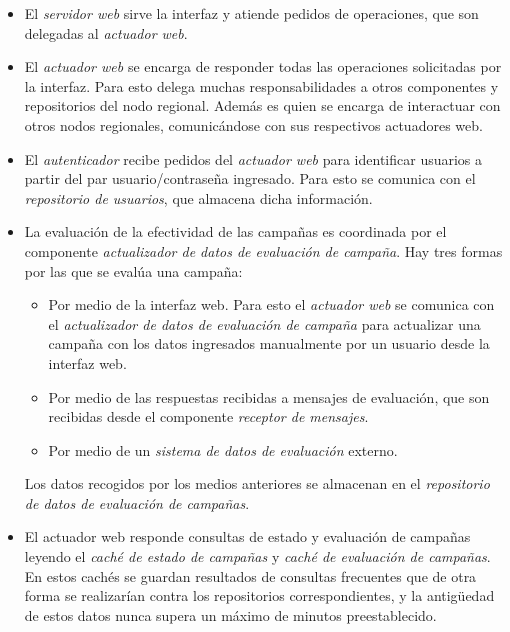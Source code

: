 \documentclass[a4paper, 10pt, twoside]{article}
\begin{document}
\begin{itemize}
  \item El \textit{servidor web} sirve la interfaz y atiende pedidos de operaciones, que son delegadas al \textit{actuador web}.

  \item El \textit{actuador web} se encarga de responder todas las operaciones solicitadas por la interfaz. Para esto delega muchas responsabilidades a otros componentes y repositorios del nodo regional. Además es quien se encarga de interactuar con otros nodos regionales, comunicándose con sus respectivos actuadores web.

  \item El \textit{autenticador} recibe pedidos del \textit{actuador web} para identificar usuarios a partir del par usuario/contraseña ingresado. Para esto se comunica con el \textit{repositorio de usuarios}, que almacena dicha información.

  \item La evaluación de la efectividad de las campañas es coordinada por el componente \textit{actualizador de datos de evaluación de campaña}. Hay tres formas por las que se evalúa una campaña:

  \begin{itemize}
    \item Por medio de la interfaz web. Para esto el \textit{actuador web} se comunica con el \textit{actualizador de datos de evaluación de campaña} para actualizar una campaña con los datos ingresados manualmente por un usuario desde la interfaz web.

    \item Por medio de las respuestas recibidas a mensajes de evaluación, que son recibidas desde el componente \textit{receptor de mensajes}.

    \item Por medio de un \textit{sistema de datos de evaluación} externo.
  \end{itemize}

  Los datos recogidos por los medios anteriores se almacenan en el \textit{repositorio de datos de evaluación de campañas}.

  \item El actuador web responde consultas de estado y evaluación de campañas leyendo el \textit{caché de estado de campañas} y \textit{caché de evaluación de campañas}. En estos cachés se guardan resultados de consultas frecuentes que de otra forma se realizarían contra los repositorios correspondientes, y la antigüedad de estos datos nunca supera un máximo de minutos preestablecido.


\end{itemize}
\end{document}
